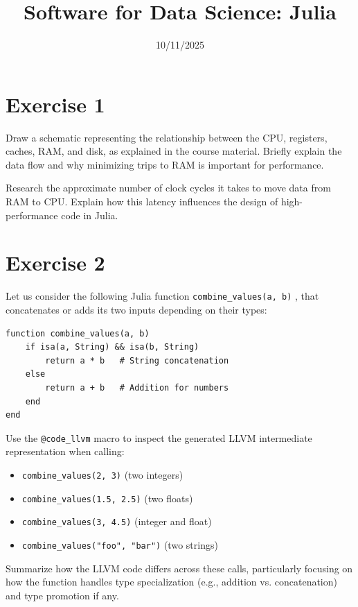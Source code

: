 \documentclass{article}
\title{Software for Data Science: Julia}
\date{10/11/2025}
\begin{document}
\maketitle
\section*{Exercise 1}

Draw a schematic representing the relationship between the CPU, registers, caches, RAM, and disk, as explained in the course material. Briefly explain the data flow and why minimizing trips to RAM is important for performance.

\noindent
Research the approximate number of clock cycles it takes to move data from RAM to CPU. Explain how this latency influences the design of high-performance code in Julia.

\section*{Exercise 2}

Let us consider the following Julia function \texttt{combine\_values(a, b)} , that concatenates or adds its two inputs depending on their types:

\begin{verbatim}
function combine_values(a, b)
    if isa(a, String) && isa(b, String)
        return a * b   # String concatenation
    else
        return a + b   # Addition for numbers
    end
end

\end{verbatim}

\noindent
Use the \texttt{@code\_llvm} macro to inspect the generated LLVM intermediate representation when calling:

\begin{itemize}
    \item \texttt{combine\_values(2, 3)} (two integers)

    \item \texttt{combine\_values(1.5, 2.5)} (two floats)

    \item \texttt{combine\_values(3, 4.5)} (integer and float)

    \item \texttt{combine\_values("foo", "bar")} (two strings)
\end{itemize}

\noindent
Summarize how the LLVM code differs across these calls, particularly focusing on how the function handles type specialization (e.g., addition vs. concatenation) and type promotion if any.
\end{document}
